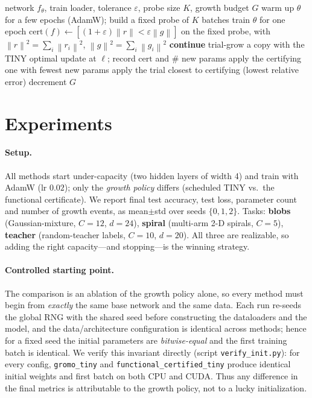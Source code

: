 \documentclass{article}
\newcommand{\norm}[1]{\left\lVert #1 \right\rVert}
\newcommand{\eps}{\varepsilon}
\begin{document}
\begin{algorithm}[t]
\caption{Certificate-driven functional-gradient growth (threshold-light)}
\label{alg:main}
\begin{algorithmic}[1]
\Require network $f_\theta$, train loader, tolerance $\eps$, probe size $K$, growth budget $G$
\State warm up $\theta$ for a few epochs (AdamW); build a fixed probe of $K$ batches
  \State train $\theta$ for one epoch 
  \State $\mathrm{cert}(f)\gets [(1+\eps)\norm{r}<\eps\norm{g}]$ on the fixed probe, with
         $\norm{r}^2{=}\sum_i\norm{r_i}^2$, $\norm{g}^2{=}\sum_i\norm{g_i}^2$
   \textbf{continue} 
      
        \State trial-grow a copy with the TINY optimal update at $\ell$; record $\mathrm{cert}$ and $\#$ new params
     \EndFor
      apply the certifying one with fewest new params
     \Else{} apply the trial closest to certifying (lowest relative error)
     \EndIf
     \State decrement $G$
  \EndIf
\EndFor
\end{algorithmic}
\end{algorithm}

\section{Experiments}\label{sec:experiments}
\paragraph{Setup.} All methods start under-capacity (two hidden layers of width
4) and train with AdamW (lr $0.02$); only the \emph{growth policy} differs
(scheduled TINY vs.\ the functional certificate). We report final test accuracy,
test loss, parameter count and number of growth events, as mean$\pm$std over
seeds $\{0,1,2\}$. Tasks: \textbf{blobs} (Gaussian-mixture, $C{=}12$, $d{=}24$),
\textbf{spiral} (multi-arm 2-D spirals, $C{=}5$), \textbf{teacher}
(random-teacher labels, $C{=}10$, $d{=}20$). All three are realizable, so adding
the right capacity---and stopping---is the winning strategy.

\paragraph{Controlled starting point.} The comparison is an ablation of the growth
policy alone, so every method must begin from \emph{exactly} the same base network
and the same data. Each run re-seeds the global RNG with the shared seed before
constructing the dataloaders and the model, and the data/architecture
configuration is identical across methods; hence for a fixed seed the initial
parameters are \emph{bitwise-equal} and the first training batch is identical. We
verify this invariant directly (script \texttt{verify\_init.py}): for every
config, \texttt{gromo\_tiny} and \texttt{functional\_certified\_tiny} produce
identical initial weights and first batch on both CPU and CUDA. Thus any
difference in the final metrics is attributable to the growth policy, not to a
lucky initialization.
\end{document}
